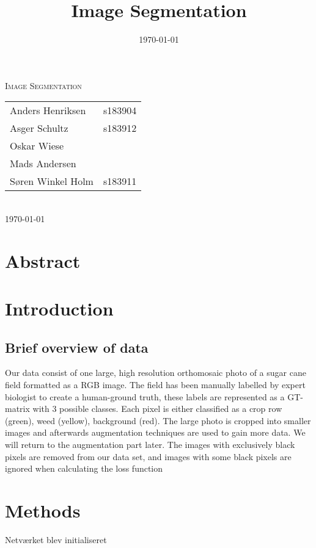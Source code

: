 \documentclass[12pt,fleqn]{article}
\title{Image Segmentation}
\author{}
\date{\today}
\begin{document}

\begin{titlepage}
	\begin{center}
		\textsc{\LARGE Image Segmentation}\\
		[1.0cm]
		{
		\large
		\begin{tabular}{lr}
			Anders Henriksen&s183904\\
			Asger Schultz&s183912\\
			Oskar Wiese&\\
			Mads Andersen&\\
			Søren Winkel Holm&s183911
		\end{tabular}
		}\\
		[0.5cm]
		\textsc{\large \today}
	\end{center}
\end{titlepage}
\tableofcontents \newpage

\section{Abstract}
\section{Introduction}
\subsection{Brief overview of data}
Our data consist of one large, high resolution orthomosaic photo of a sugar cane field formatted as a RGB image. The field has been manually labelled by expert biologist to create a human-ground truth, these labels are represented as a GT-matrix with 3 possible classes. Each pixel is either classified as a crop row (green), weed (yellow), background (red). The large photo is cropped into smaller images and afterwards augmentation techniques are used to gain more data. We will return to the augmentation part later. The images with exclusively black pixels are removed from our data set, and images with some black pixels are ignored when calculating the loss function 

\section{Methods}
Netværket blev initialiseret
\end{document}
